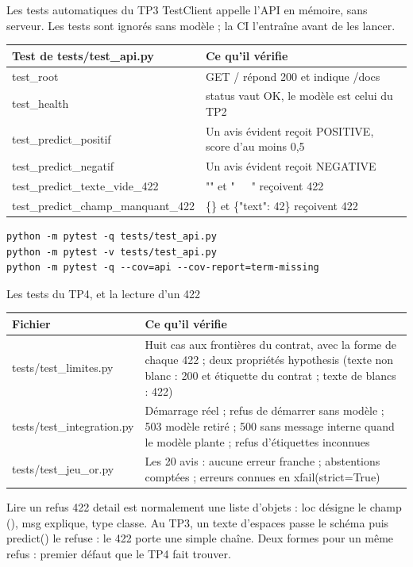 \documentclass[aspectratio=169,11pt]{beamer}
\newcommand{\co}[1]{{\ttfamily\hyphenchar\font=45\relax #1}}
\begin{document}
\begin{frame}[fragile]{Les tests automatiques du TP3}
\small \co{TestClient} appelle l'API en mémoire, sans serveur. Les tests sont ignorés sans modèle ; la CI
l'entraîne avant de les lancer.

\scriptsize
\begin{tabularx}{\textwidth}{@{}l X@{}}
\toprule
\textbf{Test de \co{tests/test\_api.py}} & \textbf{Ce qu'il vérifie} \\
\midrule
\co{test\_root} & \co{GET /} répond 200 et indique \co{/docs} \\
\co{test\_health} & \co{status} vaut \co{OK}, le modèle est celui du TP2 \\
\co{test\_predict\_positif} & Un avis évident reçoit \co{POSITIVE}, score d'au moins 0,5 \\
\co{test\_predict\_negatif} & Un avis évident reçoit \co{NEGATIVE} \\
\co{test\_predict\_texte\_vide\_422} & \co{""} et \co{"\ \ \ "} reçoivent 422 \\
\co{test\_predict\_champ\_manquant\_422} & \co{\{\}} et \co{\{"text": 42\}} reçoivent 422 \\
\bottomrule
\end{tabularx}
\begin{lstlisting}
python -m pytest -q tests/test_api.py
python -m pytest -v tests/test_api.py
python -m pytest -q --cov=api --cov-report=term-missing
\end{lstlisting}
\end{frame}

\begin{frame}{Les tests du TP4, et la lecture d'un 422}
\scriptsize
\begin{tabularx}{\textwidth}{@{}l X@{}}
\toprule
\textbf{Fichier} & \textbf{Ce qu'il vérifie} \\
\midrule
\co{tests/test\_limites.py} & Huit cas aux frontières du contrat, avec la forme de chaque 422 ; deux propriétés
hypothesis (texte non blanc : 200 et étiquette du contrat ; texte de blancs : 422) \\
\co{tests/test\_integration.py} & Démarrage réel ; refus de démarrer sans modèle ; 503 modèle retiré ; 500 sans
message interne quand le modèle plante ; refus d'étiquettes inconnues \\
\co{tests/test\_jeu\_or.py} & Les 20 avis : aucune erreur franche ; abstentions comptées ; erreurs connues en
\co{xfail(strict=True)} \\
\bottomrule
\end{tabularx}

\begin{block}{Lire un refus 422}
\small \co{detail} est normalement une liste d'objets : \co{loc} désigne le champ (\co{["body", "text"]}),
\co{msg} explique, \co{type} classe. Au TP3, un texte d'espaces passe le schéma puis \co{predict()} le refuse :
le 422 porte une simple chaîne. Deux formes pour un même refus : premier défaut que le TP4 fait trouver.
\end{block}
\end{frame}
\end{document}
